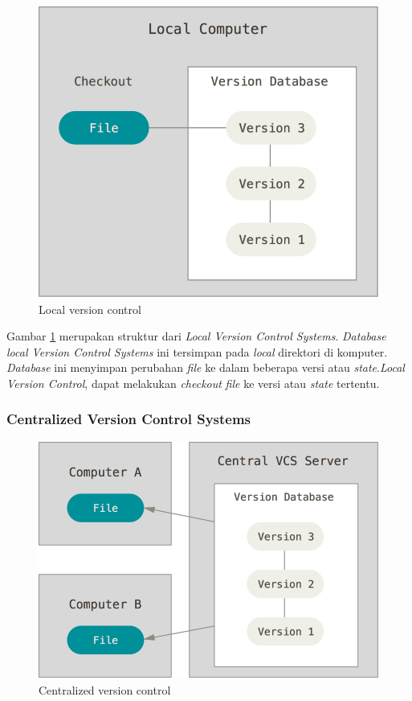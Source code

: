\begin{figure}[H]
	\centering
		\includegraphics[scale=0.25]{Gambar/localvcs.png}
	\caption{Local version control}
	\label{fig:localvcs}
\end{figure}

Gambar \ref{fig:localvcs} merupakan struktur dari \textit{Local Version Control Systems}. \textit{Database local Version Control Systems} ini tersimpan pada \textit{local} direktori di komputer. \textit{Database} ini menyimpan perubahan \textit{file} ke dalam beberapa versi atau \textit{state}.\textit{Local Version Control}, dapat melakukan \textit{checkout} \textit{file} ke versi atau \textit{state} tertentu.   
 
\subsubsection{Centralized Version Control Systems}
\begin{figure}[H]
	\centering
		\includegraphics[scale=0.25]{Gambar/centralizedvcs.png}
	\caption{Centralized version control}
	\label{fig:cvcs}
\end{figure}

